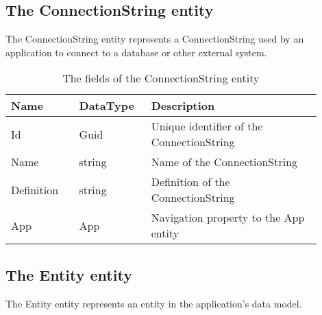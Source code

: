 \subsection{The ConnectionString entity}

The ConnectionString entity represents a ConnectionString used by an application to
connect to a database or other external system.

\begin{table}[H]
\small
\begin{tabular}{ p{0.20\linewidth} p{0.20\linewidth} p{0.50\linewidth} }
\hline
\textbf{Name} & \textbf{DataType} & \textbf{Description} \\
\hline
Id & Guid & Unique identifier of the ConnectionString \\
Name & string & Name of the ConnectionString \\
Definition & string & Definition of the ConnectionString \\
App & App & Navigation property to the App entity \\
\hline
\end{tabular}
\caption{The fields of the ConnectionString entity}
\label{table:connectionstring_entity}
\end{table}

\subsection{The Entity entity}

The Entity entity represents an entity in the application's data model. 

